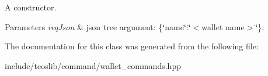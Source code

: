 A constructor. 


\begin{DoxyParams}{Parameters}
{\em req\+Json} & json tree argument\+: \{\char`\"{}name\char`\"{}\+:\char`\"{}$<$wallet name$>$\char`\"{}\}. \\
\hline
\end{DoxyParams}


The documentation for this class was generated from the following file\+:\begin{DoxyCompactItemize}
\item 
include/teoslib/command/wallet\+\_\+commands.\+hpp\end{DoxyCompactItemize}
